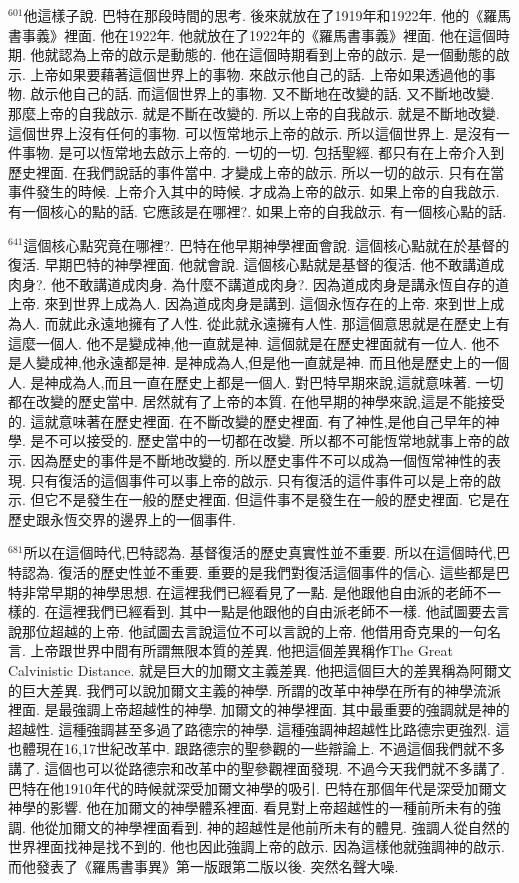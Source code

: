\documentclass{book}
\begin{document}
$^{601}$他這樣子說.
巴特在那段時間的思考.
後來就放在了1919年和1922年.
他的《羅馬書事義》裡面.
他在1922年.
他就放在了1922年的《羅馬書事義》裡面.
他在這個時期.
他就認為上帝的啟示是動態的.
他在這個時期看到上帝的啟示.
是一個動態的啟示.
上帝如果要藉著這個世界上的事物.
來啟示他自己的話.
上帝如果透過他的事物.
啟示他自己的話.
而這個世界上的事物.
又不斷地在改變的話.
又不斷地改變.
那麼上帝的自我啟示.
就是不斷在改變的.
所以上帝的自我啟示.
就是不斷地改變.
這個世界上沒有任何的事物.
可以恆常地示上帝的啟示.
所以這個世界上.
是沒有一件事物.
是可以恆常地去啟示上帝的.
一切的一切.
包括聖經.
都只有在上帝介入到歷史裡面.
在我們說話的事件當中.
才變成上帝的啟示.
所以一切的啟示.
只有在當事件發生的時候.
上帝介入其中的時候.
才成為上帝的啟示.
如果上帝的自我啟示.
有一個核心的點的話.
它應該是在哪裡?.
如果上帝的自我啟示.
有一個核心點的話.

$^{641}$這個核心點究竟在哪裡?.
巴特在他早期神學裡面會說.
這個核心點就在於基督的復活.
早期巴特的神學裡面.
他就會說.
這個核心點就是基督的復活.
他不敢講道成肉身?.
他不敢講道成肉身.
為什麼不講道成肉身?.
因為道成肉身是講永恆自存的道上帝.
來到世界上成為人.
因為道成肉身是講到.
這個永恆存在的上帝.
來到世上成為人.
而就此永遠地擁有了人性.
從此就永遠擁有人性.
那這個意思就是在歷史上有這麼一個人.
他不是變成神,他一直就是神.
這個就是在歷史裡面就有一位人.
他不是人變成神,他永遠都是神.
是神成為人,但是他一直就是神.
而且他是歷史上的一個人.
是神成為人,而且一直在歷史上都是一個人.
對巴特早期來說,這就意味著.
一切都在改變的歷史當中.
居然就有了上帝的本質.
在他早期的神學來說,這是不能接受的.
這就意味著在歷史裡面.
在不斷改變的歷史裡面.
有了神性,是他自己早年的神學.
是不可以接受的.
歷史當中的一切都在改變.
所以都不可能恆常地就事上帝的啟示.
因為歷史的事件是不斷地改變的.
所以歷史事件不可以成為一個恆常神性的表現.
只有復活的這個事件可以事上帝的啟示.
只有復活的這件事件可以是上帝的啟示.
但它不是發生在一般的歷史裡面.
但這件事不是發生在一般的歷史裡面.
它是在歷史跟永恆交界的邊界上的一個事件.

$^{681}$所以在這個時代,巴特認為.
基督復活的歷史真實性並不重要.
所以在這個時代,巴特認為.
復活的歷史性並不重要.
重要的是我們對復活這個事件的信心.
這些都是巴特非常早期的神學思想.
在這裡我們已經看見了一點.
是他跟他自由派的老師不一樣的.
在這裡我們已經看到.
其中一點是他跟他的自由派老師不一樣.
他試圖要去言說那位超越的上帝.
他試圖去言說這位不可以言說的上帝.
他借用奇克果的一句名言.
上帝跟世界中間有所謂無限本質的差異.
他把這個差異稱作The Great Calvinistic Distance.
就是巨大的加爾文主義差異.
他把這個巨大的差異稱為阿爾文的巨大差異.
我們可以說加爾文主義的神學.
所謂的改革中神學在所有的神學流派裡面.
是最強調上帝超越性的神學.
加爾文的神學裡面.
其中最重要的強調就是神的超越性.
這種強調甚至多過了路德宗的神學.
這種強調神超越性比路德宗更強烈.
這也體現在16,17世紀改革中.
跟路德宗的聖參觀的一些辯論上.
不過這個我們就不多講了.
這個也可以從路德宗和改革中的聖參觀裡面發現.
不過今天我們就不多講了.
巴特在他1910年代的時候就深受加爾文神學的吸引.
巴特在那個年代是深受加爾文神學的影響.
他在加爾文的神學體系裡面.
看見對上帝超越性的一種前所未有的強調.
他從加爾文的神學裡面看到.
神的超越性是他前所未有的體見.
強調人從自然的世界裡面找神是找不到的.
他也因此強調上帝的啟示.
因為這樣他就強調神的啟示.
而他發表了《羅馬書事異》第一版跟第二版以後.
突然名聲大噪.
\end{document}
